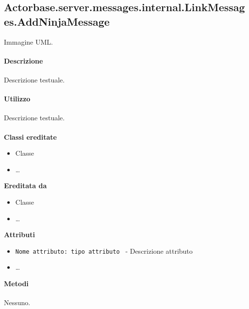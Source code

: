 \documentclass[a4paper]{article}
\begin{document}
	\subsection{Actorbase.server.messages.internal.LinkMessages.AddNinjaMessage}
		Immagine UML.
		\\ \\
		\textbf{Descrizione}
			\\ \\
			Descrizione testuale.
			\\ \\
		\textbf{Utilizzo}
			\\ \\
			Descrizione testuale.
			\\ \\
		\textbf{Classi ereditate}
			\begin{itemize}
				\item Classe
				\item \dots
			\end{itemize}
		\textbf{Ereditata da}
			\begin{itemize}
				\item Classe
				\item \dots
			\end{itemize}
		\textbf{Attributi}
			\begin{itemize}
				\item \texttt{Nome attributo: tipo attributo } - Descrizione attributo
				\item \dots
			\end{itemize}
		\textbf{Metodi}
			\\ \\
			Nessuno.
			
\end{document}
